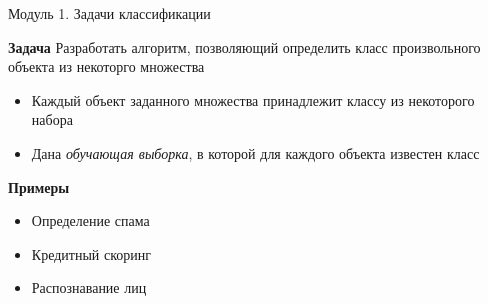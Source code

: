 \documentclass[10pt,a4paper]{beamer}
\begin{document}
\begin{frame}{Модуль 1. Задачи классификации}

{\bf Задача} Разработать алгоритм, позволяющий определить класс произвольного объекта из некоторго множества
\begin{itemize}
\item Каждый объект заданного множества принадлежит классу из некоторого набора
\item Дана {\it обучающая выборка}, в которой для каждого объекта известен класс
\end{itemize}

{\bf Примеры}
\begin{itemize}
\item Определение спама
\item Кредитный скоринг
\item Распознавание лиц
\end{itemize}

\end{frame}

\end{document}
